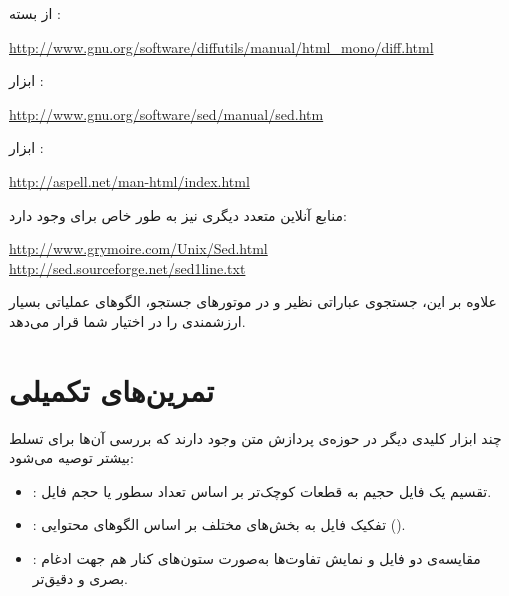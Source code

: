 از بسته :

\begin{latin}
\url{http://www.gnu.org/software/diffutils/manual/html_mono/diff.html}
\end{latin}

ابزار :

\begin{latin}
\url{http://www.gnu.org/software/sed/manual/sed.htm}
\end{latin}

ابزار :

\begin{latin}
\url{http://aspell.net/man-html/index.html}
\end{latin}

منابع آنلاین متعدد دیگری نیز به طور خاص برای  وجود دارد:

\begin{latin}
\url{http://www.grymoire.com/Unix/Sed.html}\\
\url{http://sed.sourceforge.net/sed1line.txt}
\end{latin}

علاوه بر این، جستجوی عباراتی نظیر  و  در موتورهای جستجو، الگوهای عملیاتی بسیار ارزشمندی را در اختیار شما قرار می‌دهد.

\section{تمرین‌های تکمیلی}

چند ابزار کلیدی دیگر در حوزه‌ی پردازش متن وجود دارند که بررسی آن‌ها برای تسلط بیشتر توصیه می‌شود:

\begin{itemize}
  \item {}: تقسیم یک فایل حجیم به قطعات کوچک‌تر بر اساس تعداد سطور یا حجم فایل.
  \item {}: تفکیک فایل به بخش‌های مختلف بر اساس الگوهای محتوایی ().
  \item {}: مقایسه‌ی دو فایل و نمایش تفاوت‌ها به‌صورت ستون‌های کنار هم جهت ادغام بصری و دقیق‌تر.
\end{itemize}